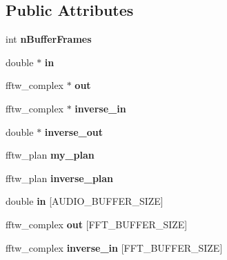\subsection*{Public Attributes}
\begin{DoxyCompactItemize}
\item 
\hypertarget{classfft_ab960a894180e634d2eace4b68700dff3}{int {\bfseries n\-Buffer\-Frames}}\label{classfft_ab960a894180e634d2eace4b68700dff3}

\item 
\hypertarget{classfft_ad52a575c3cf3f7aae014927bcc4cbbe2}{double $\ast$ {\bfseries in}}\label{classfft_ad52a575c3cf3f7aae014927bcc4cbbe2}

\item 
\hypertarget{classfft_a21e2e595b77d7f003ec24075eb892fe1}{fftw\-\_\-complex $\ast$ {\bfseries out}}\label{classfft_a21e2e595b77d7f003ec24075eb892fe1}

\item 
\hypertarget{classfft_a30b05b794baa0c8965b7e4cc63bafd98}{fftw\-\_\-complex $\ast$ {\bfseries inverse\-\_\-in}}\label{classfft_a30b05b794baa0c8965b7e4cc63bafd98}

\item 
\hypertarget{classfft_a162e76aaf4e73ff332cd71f81556fbcc}{double $\ast$ {\bfseries inverse\-\_\-out}}\label{classfft_a162e76aaf4e73ff332cd71f81556fbcc}

\item 
\hypertarget{classfft_a2845f6a00618246fc6adfb57ae106925}{fftw\-\_\-plan {\bfseries my\-\_\-plan}}\label{classfft_a2845f6a00618246fc6adfb57ae106925}

\item 
\hypertarget{classfft_a8b7b6b88eb0b9aaf7ae7580e5b42a533}{fftw\-\_\-plan {\bfseries inverse\-\_\-plan}}\label{classfft_a8b7b6b88eb0b9aaf7ae7580e5b42a533}

\item 
\hypertarget{classfft_ad7bd6dde9d599f62bd764ad986ac4305}{double {\bfseries in} \mbox{[}A\-U\-D\-I\-O\-\_\-\-B\-U\-F\-F\-E\-R\-\_\-\-S\-I\-Z\-E\mbox{]}}\label{classfft_ad7bd6dde9d599f62bd764ad986ac4305}

\item 
\hypertarget{classfft_a6c30ac336ab818e27c0a819ad942a6f3}{fftw\-\_\-complex {\bfseries out} \mbox{[}F\-F\-T\-\_\-\-B\-U\-F\-F\-E\-R\-\_\-\-S\-I\-Z\-E\mbox{]}}\label{classfft_a6c30ac336ab818e27c0a819ad942a6f3}

\item 
\hypertarget{classfft_adc3213de8e941a184c2ec3a1ca31815a}{fftw\-\_\-complex {\bfseries inverse\-\_\-in} \mbox{[}F\-F\-T\-\_\-\-B\-U\-F\-F\-E\-R\-\_\-\-S\-I\-Z\-E\mbox{]}}\label{classfft_adc3213de8e941a184c2ec3a1ca31815a}


\end{DoxyCompactItemize}
